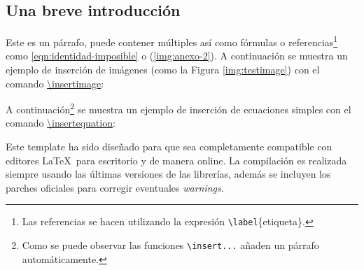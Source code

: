 \subsection{Una breve introducción}
	
	Este es un párrafo, puede contener múltiples  así como fórmulas o referencias\footnote{Las referencias se hacen utilizando la expresión \texttt{\textbackslash label}\{etiqueta\}.} como \eqref{eqn:identidad-imposible} o (\ref{img:anexo-2}). A continuación se muestra un ejemplo de inserción de imágenes (como la Figura \ref{img:testimage}) con el comando \href{https://latex.ppizarror.com/informe.html#hlp-imagen}{\textbackslash insertimage}:



	A continuación\footnote{Como se puede observar las funciones \texttt{\textbackslash insert...} añaden un párrafo automáticamente.} se muestra un ejemplo de inserción de ecuaciones simples con el comando \href{https://latex.ppizarror.com/informe.html#hlp-formulae}{\textbackslash insertequation}:


	Este template \cite{template} ha sido diseñado para que sea completamente compatible con editores \LaTeX\ para escritorio y de manera online. La compilación es realizada siempre usando las últimas versiones de las librerías, además se incluyen los parches oficiales para corregir eventuales \textit{warnings}. \\

